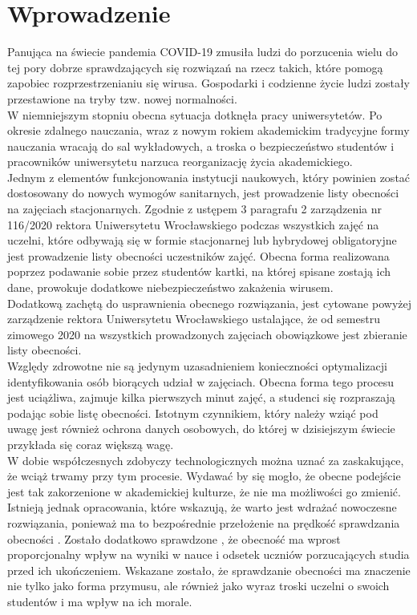 \documentclass[declaration,shortabstract, mgr]{iithesis}
\author {Dawid Szczyrk}
\begin{document}
\chapter{Wprowadzenie}

\indent Panująca na świecie pandemia COVID-19 zmusiła ludzi do porzucenia wielu do tej pory dobrze sprawdzających się rozwiązań na rzecz takich, które pomogą zapobiec rozprzestrzenianiu się wirusa. Gospodarki i codzienne życie ludzi zostały przestawione na tryby tzw. nowej normalności.\\
\indent W niemniejszym stopniu obecna sytuacja dotknęła pracy uniwersytetów. Po okresie zdalnego nauczania, wraz z nowym rokiem akademickim tradycyjne formy nauczania wracają do sal wykładowych, a troska o bezpieczeństwo studentów i pracowników uniwersytetu narzuca reorganizację życia akademickiego.\\
\indent Jednym z elementów funkcjonowania instytucji naukowych, który powinien zostać dostosowany do nowych wymogów sanitarnych, jest prowadzenie listy obecności na zajęciach stacjonarnych. Zgodnie z ustępem 3 paragrafu 2 zarządzenia nr 116/2020 rektora Uniwersytetu Wrocławskiego \cite{uwr} podczas wszystkich zajęć na uczelni, które odbywają się w formie stacjonarnej lub hybrydowej obligatoryjne jest prowadzenie listy obecności uczestników zajęć. Obecna forma realizowana poprzez podawanie sobie przez studentów kartki, na której spisane zostają ich dane, prowokuje dodatkowe niebezpieczeństwo zakażenia wirusem. \\
\indent Dodatkową zachętą do usprawnienia obecnego rozwiązania, jest cytowane powyżej zarządzenie rektora Uniwersytetu Wrocławskiego ustalające, że od semestru zimowego 2020 na wszystkich prowadzonych zajęciach obowiązkowe jest zbieranie listy obecności. \\
\indent Względy zdrowotne nie są jedynym uzasadnieniem konieczności optymalizacji identyfikowania osób biorących udział w zajęciach. Obecna forma tego procesu jest uciążliwa, zajmuje kilka pierwszych minut zajęć, a studenci się rozpraszają podając sobie listę obecności. Istotnym czynnikiem, który należy wziąć pod uwagę jest również ochrona danych osobowych, do której w dzisiejszym świecie przykłada się coraz większą wagę.\\
\indent W dobie współczesnych zdobyczy technologicznych można uznać za zaskakujące, że wciąż trwamy przy tym procesie. Wydawać by się mogło, że obecne podejście jest tak zakorzenione w akademickiej kulturze, że nie ma możliwości go zmienić. Istnieją jednak opracowania, które wskazują, że warto jest wdrażać nowoczesne rozwiązania, ponieważ ma to bezpośrednie przełożenie na prędkość sprawdzania obecności \cite{lcd}. Zostało dodatkowo sprawdzone \cite{theory_base}, że obecność ma wprost proporcjonalny wpływ na wyniki w nauce i odsetek uczniów porzucających studia przed ich ukończeniem. Wskazane zostało, że sprawdzanie obecności ma znaczenie nie tylko jako forma przymusu, ale również jako wyraz troski uczelni o swoich studentów i ma wpływ na ich morale.\\
\end{document}

